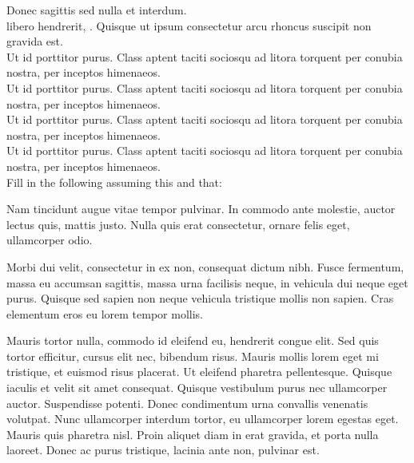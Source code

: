 \documentclass[10pt,a4paper]{article}
\begin{document}
\questsection Donec sagittis sed nulla et interdum. \\

\questsection libero hendrerit, . Quisque ut ipsum consectetur arcu rhoncus suscipit non gravida est.\\

\questsection Ut id porttitor purus. Class aptent taciti sociosqu ad litora torquent per conubia nostra, per inceptos himenaeos. \truefalse\\

\questsection Ut id porttitor purus. Class aptent taciti sociosqu ad litora torquent per conubia nostra, per inceptos himenaeos. \falsetrue\\

\questsection Ut id porttitor purus. Class aptent taciti sociosqu ad litora torquent per conubia nostra, per inceptos himenaeos. \truefalse\\

\questsection Ut id porttitor purus. Class aptent taciti sociosqu ad litora torquent per conubia nostra, per inceptos himenaeos. \falsetrue\\

\questsection
Fill in the following assuming this and that:\\[1em]
\begin{answerminip}{9em}{.45\linewidth}
Nam tincidunt augue vitae tempor pulvinar. In commodo ante molestie, auctor lectus quis, mattis justo. Nulla quis erat consectetur, ornare felis eget, ullamcorper odio.
\end{answerminip}
\hspace*{1em}
\begin{answerminip}{9em}{.45\linewidth}
Morbi dui velit, consectetur in ex non, consequat dictum nibh. Fusce fermentum, massa eu accumsan sagittis, massa urna facilisis neque, in vehicula dui neque eget purus. Quisque sed sapien non neque vehicula tristique mollis non sapien. Cras elementum eros eu lorem tempor mollis. 
\end{answerminip}

\newpage
{}
Mauris tortor nulla, commodo id eleifend eu, hendrerit congue elit. Sed quis tortor efficitur, cursus elit nec, bibendum risus. Mauris mollis lorem eget mi tristique, et euismod risus placerat. Ut eleifend pharetra pellentesque. Quisque iaculis et velit sit amet consequat. Quisque vestibulum purus nec ullamcorper auctor. Suspendisse potenti. Donec condimentum urna convallis venenatis volutpat. Nunc ullamcorper interdum tortor, eu ullamcorper lorem egestas eget. Mauris quis pharetra nisl. Proin aliquet diam in erat gravida, et porta nulla laoreet. Donec ac purus tristique, lacinia ante non, pulvinar est. 
\end{document}
